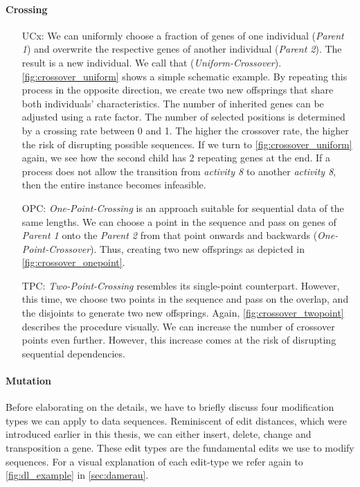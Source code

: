 \documentclass[./../../paper.tex]{subfiles}
\begin{document}
\paragraph{Crossing}
\begin{enumerate}
    \item[UCx:] We can uniformly choose a fraction of genes of one individual (\emph{Parent 1}) and overwrite the respective genes of another individual (\emph{Parent 2}). The result is a new individual. We call that (\emph{Uniform-Crossover}).
          \autoref{fig:crossover_uniform} shows a simple schematic example. By repeating this process in the opposite direction, we create two new offsprings that share both individuals' characteristics.
          The number of inherited genes can be adjusted using a rate factor. The number of selected positions is determined by a crossing rate between 0 and 1. The higher the crossover rate, the higher the risk of disrupting possible sequences. If we turn to \autoref{fig:crossover_uniform} again, we see how the second child has 2 repeating genes at the end. If a process does not allow the transition from \emph{activity 8} to another \emph{activity 8}, then the entire \gls{instance} becomes infeasible.
    \item[OPC:] \emph{One-Point-Crossing} is an approach suitable for sequential data of the same lengths. We can choose a point in the sequence and pass on genes of \emph{Parent 1} onto the \emph{Parent 2} from that point onwards and backwards (\emph{One-Point-Crossover}).
          Thus, creating two new offsprings as depicted in \autoref{fig:crossover_onepoint}.
    \item[TPC:] \emph{Two-Point-Crossing} resembles its single-point counterpart. However, this time, we choose two points in the sequence and pass on the overlap, and the disjoints to generate two new offsprings. Again, \autoref{fig:crossover_twopoint} describes the procedure visually. We can increase the number of crossover points even further. However, this increase comes at the risk of disrupting sequential dependencies.
\end{enumerate}







\paragraph{Mutation}
Before elaborating on the details, we have to briefly discuss four modification types we can apply to data sequences. Reminiscent of edit distances, which were introduced earlier in this thesis, we can either insert, delete, change and transposition a gene. These edit types are the fundamental edits we use to modify sequences. For a visual explanation of each edit-type we refer again to \autoref{fig:dl_example} in \autoref{sec:damerau}.
\end{document}
